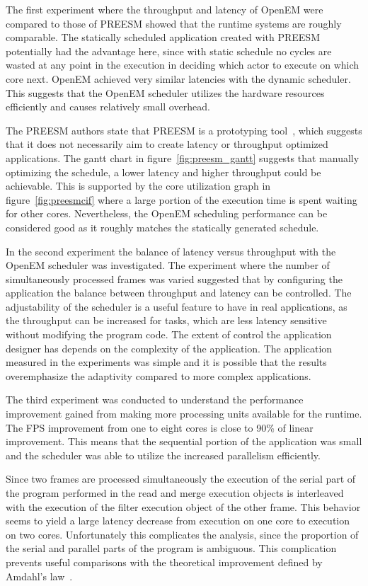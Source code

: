 \FloatBarrier
The first experiment where the throughput and latency of OpenEM were compared to those of PREESM showed that the runtime systems are roughly comparable. The statically scheduled application created with PREESM potentially had the advantage here, since with static schedule no cycles are wasted at any point in the execution in deciding which actor to execute on which core next. OpenEM achieved very similar latencies with the dynamic scheduler. This suggests that the OpenEM scheduler utilizes the hardware resources efficiently and causes relatively small overhead.

The PREESM authors state that PREESM is a prototyping tool~\cite{preesm}, which suggests that it does not necessarily aim to create latency or throughput optimized applications. The gantt chart in figure~\ref{fig:preesm_gantt} suggests that manually optimizing the schedule, a lower latency and higher throughput could be achievable. This is supported by the core utilization graph in figure~\ref{fig:preesmcif} where a large portion of the execution time is spent waiting for other cores. Nevertheless, the OpenEM scheduling performance can be considered good as it roughly matches the statically generated schedule.

In the second experiment the balance of latency versus throughput with the OpenEM scheduler was investigated. The experiment where the number of simultaneously processed frames was varied suggested that by configuring the application the balance between throughput and latency can be controlled. The adjustability of the scheduler is a useful feature to have in real applications, as the throughput can be increased for tasks, which are less latency sensitive without modifying the program code. The extent of control the application designer has depends on the complexity of the application. The application measured in the experiments was simple and it is possible that the results overemphasize the adaptivity compared to more complex applications.

The third experiment was conducted to understand the performance improvement gained from making more processing units available for the runtime. The FPS improvement from one to eight cores is close to 90\% of linear improvement. This means that the sequential portion of the application was small and the scheduler was able to utilize the increased parallelism efficiently.

Since two frames are processed simultaneously the execution of the serial part of the program performed in the read and merge execution objects is interleaved with the execution of the filter execution object of the other frame. This behavior seems to yield a large latency decrease from execution on one core to execution on two cores. Unfortunately this complicates the analysis, since the proportion of the serial and parallel parts of the program is ambiguous. This complication prevents useful comparisons with the theoretical improvement defined by Amdahl's law~\cite{amdahl1967validity}.

